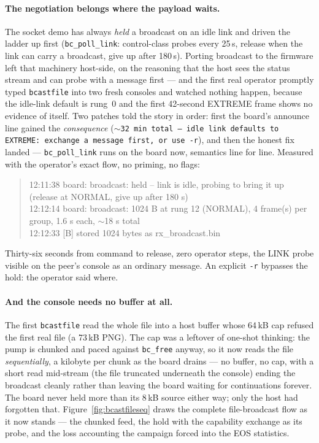 \paragraph{The negotiation belongs where the payload waits.} The
socket demo has always \emph{held} a broadcast on an idle link and
driven the ladder up first (\texttt{bc\_poll\_link}: control-class
probes every 25\,s, release when the link can carry a broadcast, give
up after 180\,s). Porting broadcast to the firmware left that
machinery host-side, on the reasoning that the host sees the status
stream and can probe with a message first --- and the first real
operator promptly typed \texttt{bcastfile} into two fresh consoles
and watched nothing happen, because the idle-link default is rung~0
and the first 42-second EXTREME frame shows no evidence of itself. Two
patches told the story in order: first the board's announce line
gained the \emph{consequence} (\texttt{$\sim$32 min total -- idle
link defaults to EXTREME: exchange a message first, or use -r}), and
then the honest fix landed --- \texttt{bc\_poll\_link} runs on the
board now, semantics line for line. Measured with the operator's exact
flow, no priming, no flags:

\begin{quote}\ttfamily\small
12:11:38 board: broadcast: held -- link is idle, probing to bring it
up (release at NORMAL, give up after 180 s)\\
12:12:14 board: broadcast: 1024 B at rung 12 (NORMAL), 4 frame(s) per
group, 1.6 s each, $\sim$18 s total\\
12:12:33 [B] stored 1024 bytes as rx\_broadcast.bin
\end{quote}

Thirty-six seconds from command to release, zero operator steps, the
LINK probe visible on the peer's console as an ordinary message. An
explicit \texttt{-r} bypasses the hold: the operator said where.

\paragraph{And the console needs no buffer at all.} The first
\texttt{bcastfile} read the whole file into a host buffer whose
64\,kB cap refused the first real file (a 73\,kB PNG). The cap was a
leftover of one-shot thinking: the pump is chunked and paced against
\texttt{bc\_free} anyway, so it now reads the file
\emph{sequentially}, a kilobyte per chunk as the board drains --- no
buffer, no cap, with a short read mid-stream (the file truncated
underneath the console) ending the broadcast cleanly rather than
leaving the board waiting for continuations forever. The board never
held more than its 8\,kB source either way; only the host had
forgotten that. Figure~\ref{fig:bcastfileseq} draws the complete
file-broadcast flow as it now stands --- the chunked feed, the hold
with the capability exchange as its probe, and the loss accounting the
campaign forced into the EOS statistics.

